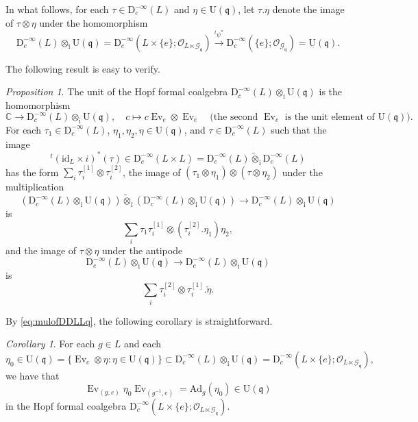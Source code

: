 \documentclass[12pt, a4paper]{amsart}
\newcommand{\BC}{{\mathbb {C}}}
\newcommand{\CG}{{\mathcal {G}}}
\newcommand{\CO}{{\mathcal {O}}}
\newcommand{\RD}{{\mathrm {D}}}
\newcommand{\Ri}{{\mathrm{i}}}
\newcommand{\RU}{{\mathrm {U}}}
\newcommand{\Ad}{{\mathrm{Ad}}}
\newcommand{\wt}{\widetilde}
\newcommand{\Ev}{\operatorname{Ev}}
\newcommand{\q}{\mathfrak q}
\newcommand{\be}{\begin {equation}}
\newcommand{\ee}{\end {equation}}
\theoremstyle{Theorem}
\theoremstyle{Theorem}
\theoremstyle{Theorem}
\theoremstyle{Theorem}
\theoremstyle{Plain}
\theoremstyle{remark}
\theoremstyle{remark}
\theoremstyle{Definition}
\newtheorem{cord}[dfn]{Corollary}
\newtheorem{prpd}[dfn]{Proposition}
\numberwithin{equation}{section}
\begin{document}
 In what follows, for each $\tau\in  \RD^{-\infty}_c(L)$ and $\eta\in \RU(\q)$, let $\tau.\eta$ denote the image of $\tau\otimes\eta$ under the 
homomorphism 
\[  \RD^{-\infty}_c(L)\otimes_{\mathrm{i}}\RU(\q)=\RD^{-\infty}_c(L\times\{e\};\CO_{L\ltimes \CG_{\q}})\xrightarrow{{}^t\psi^*}\RD^{-\infty}_c(\{e\};\CO_{\CG_{\q}})=\RU(\q).\] 

The following result is easy to verify.

\begin{prpd}\label{prop:DofLLq}
The unit of the Hopf formal coalgebra  $\RD^{-\infty}_c(L)\otimes_{\mathrm{i}}\RU(\q)$ is the homomorphism 
\[\BC\rightarrow \RD^{-\infty}_c(L)\otimes_{\mathrm{i}}\RU(\q), \quad c\mapsto c\Ev_e\otimes \Ev_e\quad\text{(the second $\Ev_e$ is the unit element of $\RU(\q)$)}.\] For each $\tau_1\in \RD^{-\infty}_c(L)$, $\eta_1,\eta_2,\eta\in \RU(\q)$, and $\tau\in \RD^{-\infty}_c(L)$ such that the image \[{}^t(\mathrm{id}_L\times i)^*(\tau)\in \RD^{-\infty}_c(L\times L)=\RD^{-\infty}_c(L)\wt\otimes_{\Ri}\RD^{-\infty}_c(L)\] has the form 
$\sum_{i}\tau_i^{[1]}\otimes\tau_i^{[2]}$, the image of $(\tau_1\otimes\eta_1)\otimes(\tau\otimes\eta_2)$ under the multiplication 
\[(\RD^{-\infty}_c(L)\otimes_{\mathrm{i}}\RU(\q))\wt\otimes_{\mathrm{i}}(\RD^{-\infty}_c(L)\otimes_{\mathrm{i}}\RU(\q))\rightarrow \RD^{-\infty}_c(L)\otimes_{\mathrm{i}}\RU(\q)\]
is
\be\label{eq:mulofDDLLq}\sum_i\tau_1\tau^{[1]}_{i}\otimes(\tau_{i}^{[2]}.\eta_1)\eta_2,
\ee
and the image of $\tau\otimes\eta$ under the antipode 
\[\RD^{-\infty}_c(L)\otimes_{\mathrm{i}}\RU(\q)\rightarrow \RD^{-\infty}_c(L)\otimes_{\mathrm{i}}\RU(\q)\]
is 
\be\label{eq:antiofDLLq} \sum_i \tau^{[2]}_i\otimes\tau_i^{[1]}.\check{\eta}. \ee
\end{prpd}

By \eqref{eq:mulofDDLLq}, the following corollary is straightforward.
\begin{cord}
For each $g\in L$ and each \[\eta_0\in \RU(\q)=\{\Ev_e\otimes\eta:\eta\in \RU(\q)\}\subset \RD^{-\infty}_c(L)\otimes_{\mathrm{i}}\RU(\q)= \RD^{-\infty}_c(L\times \{e\};\CO_{L\ltimes \CG_{\q}}) ,\] we have that \be\label{eq:realAd} \Ev_{(g,e)}\eta_0 \Ev_{(g^{-1},e)}=\Ad_{g}(\eta_0)\in \RU(\q) \ee in the Hopf formal coalgebra $\RD^{-\infty}_c(L\times \{e\};\CO_{L\ltimes \CG_{\q}})$.
\end{cord}
\end{document}
